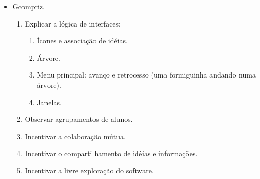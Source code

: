 \begin{itemize}
	\item Gcompriz.
	\begin{enumerate}
		\item Explicar a lógica de interfaces:
		\begin{enumerate}
			\item Ícones e associação de idéias.
			\item Árvore.
			\item Menu principal: avanço e retrocesso (uma formiguinha andando numa árvore).
	\item Janelas.
		\end{enumerate}
	\item Observar agrupamentos de alunos.
	\item Incentivar a colaboração mútua.
	\item Incentivar o compartilhamento de idéias e informações.
	\item Incentivar a livre exploração do software.
	\end{enumerate}
\end{itemize}